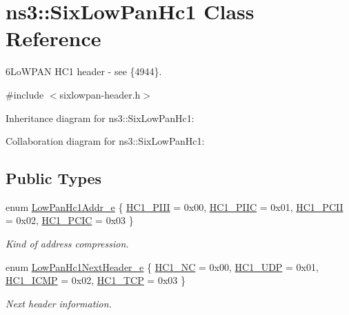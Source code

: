 \hypertarget{classns3_1_1SixLowPanHc1}{}\section{ns3\+:\+:Six\+Low\+Pan\+Hc1 Class Reference}
\label{classns3_1_1SixLowPanHc1}


6\+Lo\+W\+P\+AN H\+C1 header -\/ see \{4944\}.  




{\ttfamily \#include $<$sixlowpan-\/header.\+h$>$}



Inheritance diagram for ns3\+:\+:Six\+Low\+Pan\+Hc1\+:


Collaboration diagram for ns3\+:\+:Six\+Low\+Pan\+Hc1\+:
\subsection*{Public Types}
\begin{DoxyCompactItemize}
\item 
enum \hyperlink{classns3_1_1SixLowPanHc1_a29c864d9bf6bc466ee2214a95a83dcad}{Low\+Pan\+Hc1\+Addr\+\_\+e} \{ \hyperlink{classns3_1_1SixLowPanHc1_a29c864d9bf6bc466ee2214a95a83dcada33fbbb35ed064759434a773a85d2d325}{H\+C1\+\_\+\+P\+I\+II} = 0x00, 
\hyperlink{classns3_1_1SixLowPanHc1_a29c864d9bf6bc466ee2214a95a83dcada8e07a41c91e304c47d01515d51d399ca}{H\+C1\+\_\+\+P\+I\+IC} = 0x01, 
\hyperlink{classns3_1_1SixLowPanHc1_a29c864d9bf6bc466ee2214a95a83dcada3b9d64b07cd392302c87ed69164f0793}{H\+C1\+\_\+\+P\+C\+II} = 0x02, 
\hyperlink{classns3_1_1SixLowPanHc1_a29c864d9bf6bc466ee2214a95a83dcada2e3b9656c8f4d8912d0bf078533e298f}{H\+C1\+\_\+\+P\+C\+IC} = 0x03
 \}\begin{DoxyCompactList}\small\item\em Kind of address compression. \end{DoxyCompactList}
\item 
enum \hyperlink{classns3_1_1SixLowPanHc1_a685a2989be331260334b9ae653624cba}{Low\+Pan\+Hc1\+Next\+Header\+\_\+e} \{ \hyperlink{classns3_1_1SixLowPanHc1_a685a2989be331260334b9ae653624cbaa3d571ddeea8bf7681570b384c158d893}{H\+C1\+\_\+\+NC} = 0x00, 
\hyperlink{classns3_1_1SixLowPanHc1_a685a2989be331260334b9ae653624cbaa38710e54a844314ae2d535af2ba5cd30}{H\+C1\+\_\+\+U\+DP} = 0x01, 
\hyperlink{classns3_1_1SixLowPanHc1_a685a2989be331260334b9ae653624cbaa9597911ebf8cc68cd35cd48bbcb839d9}{H\+C1\+\_\+\+I\+C\+MP} = 0x02, 
\hyperlink{classns3_1_1SixLowPanHc1_a685a2989be331260334b9ae653624cbaaf45664dce0c17066b438fc82b5a8e9fa}{H\+C1\+\_\+\+T\+CP} = 0x03
 \}\begin{DoxyCompactList}\small\item\em Next header information. \end{DoxyCompactList}
\end{DoxyCompactItemize}
